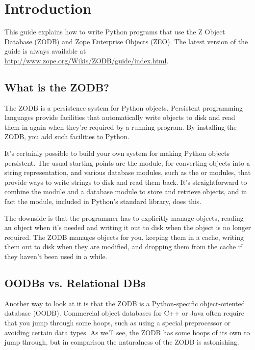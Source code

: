 

\section{Introduction}

This guide explains how to write Python programs that use the Z Object
Database (ZODB) and Zope Enterprise Objects (ZEO).  The latest version
of the guide is always available at
\url{http://www.zope.org/Wikis/ZODB/guide/index.html}.

\subsection{What is the ZODB?}

The ZODB is a persistence system for Python objects.  Persistent
programming languages provide facilities that automatically write
objects to disk and read them in again when they're required by a
running program.  By installing the ZODB, you add such facilities to
Python.

It's certainly possible to build your own system for making Python
objects persistent.  The usual starting points are the 
module, for converting objects into a string representation, and
various database modules, such as the  or 
modules, that provide ways to write strings to disk and read them
back.  It's straightforward to combine the  module and
a database module to store and retrieve objects, and in fact the
 module, included in Python's standard library, does
this.

The downside is that the programmer has to explicitly manage objects,
reading an object when it's needed and writing it out to disk when the
object is no longer required.  The ZODB manages objects for you,
keeping them in a cache, writing them out to disk when they are
modified, and dropping them from the cache if they haven't been used
in a while.


\subsection{OODBs vs. Relational DBs}

Another way to look at it is that the ZODB is a Python-specific
object-oriented database (OODB).  Commercial object databases for C++
or Java often require that you jump through some hoops, such as using
a special preprocessor or avoiding certain data types.  As we'll see,
the ZODB has some hoops of its own to jump through, but in comparison
the naturalness of the ZODB is astonishing.

